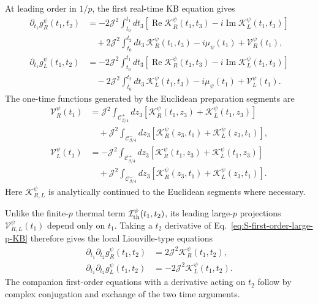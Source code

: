 \documentclass[11pt,a4paper]{article}
\begin{document}
At leading order in \(1/p\), the first real-time KB equation gives
\begin{equation}
\begin{aligned}
\partial_{t_1}g^\psi_R(t_1,t_2)
&=
-2\mathcal J^2
\int_{t_0}^{t_1}dt_3
\left[
\operatorname{Re}\mathcal K^\psi_R(t_1,t_3)
-i\operatorname{Im}\mathcal K^\psi_L(t_1,t_3)
\right]
\\
&\quad
+2\mathcal J^2
\int_{t_0}^{t_2}dt_3\,
\mathcal K^\psi_R(t_1,t_3)
-i\mu_\psi(t_1)
+\mathcal V^\psi_R(t_1),
\\
\partial_{t_1}g^\psi_L(t_1,t_2)
&=
-2\mathcal J^2
\int_{t_0}^{t_1}dt_3
\left[
\operatorname{Re}\mathcal K^\psi_R(t_1,t_3)
-i\operatorname{Im}\mathcal K^\psi_L(t_1,t_3)
\right]
\\
&\quad
-2\mathcal J^2
\int_{t_0}^{t_2}dt_3\,
\mathcal K^\psi_L(t_1,t_3)
-i\mu_\psi(t_1)
+\mathcal V^\psi_L(t_1).
\end{aligned}
\label{eq:S-first-order-large-p-KB}
\end{equation}
The one-time functions generated by the Euclidean preparation segments are
\begin{equation}
\begin{aligned}
\mathcal V^\psi_R(t_1)
&=
\mathcal J^2
\int_{\mathcal C^+_{\beta/4}}dz_3
\left[
\mathcal K^\psi_R(t_1,z_3)
+
\mathcal K^\psi_L(t_1,z_3)
\right]
\\
&\quad
+
\mathcal J^2
\int_{\mathcal C^-_{\beta/4}}dz_3
\left[
\mathcal K^\psi_R(z_3,t_1)
+
\mathcal K^\psi_L(z_3,t_1)
\right],
\\
\mathcal V^\psi_L(t_1)
&=
-\mathcal J^2
\int_{\mathcal C^+_{\beta/4}}dz_3
\left[
\mathcal K^\psi_R(t_1,z_3)
+
\mathcal K^\psi_L(t_1,z_3)
\right]
\\
&\quad
+
\mathcal J^2
\int_{\mathcal C^-_{\beta/4}}dz_3
\left[
\mathcal K^\psi_R(z_3,t_1)
+
\mathcal K^\psi_L(z_3,t_1)
\right].
\end{aligned}
\label{eq:S-large-p-vertical}
\end{equation}
Here \(\mathcal K^\psi_{R,L}\) is analytically continued to the Euclidean
segments where necessary.

Unlike the finite-\(p\) thermal term
\(\mathcal I^\psi_{\rm th}(t_1,t_2)\), its leading large-\(p\) projections
\(\mathcal V^\psi_{R,L}(t_1)\) depend only on \(t_1\). Taking a
\(t_2\) derivative of Eq.~\eqref{eq:S-first-order-large-p-KB} therefore gives
the local Liouville-type equations
\begin{equation}
\begin{aligned}
\partial_{t_1}\partial_{t_2}
g^\psi_R(t_1,t_2)
&=
2\mathcal J^2
\mathcal K^\psi_R(t_1,t_2),
\\
\partial_{t_1}\partial_{t_2}
g^\psi_L(t_1,t_2)
&=
-2\mathcal J^2
\mathcal K^\psi_L(t_1,t_2).
\end{aligned}
\label{eq:S-large-p-Liouville-general}
\end{equation}
The companion first-order equations with a derivative acting on \(t_2\)
follow by complex conjugation and exchange of the two time arguments.
\end{document}
